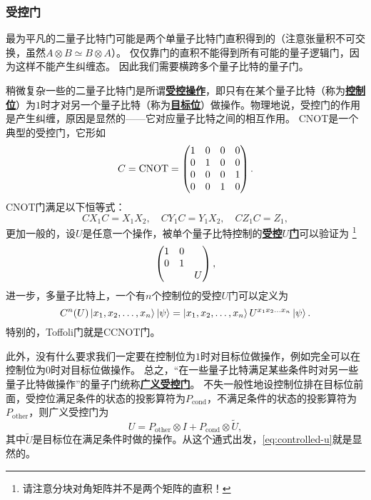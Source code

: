 \documentclass[hyperref, UTF8, a4paper]{ctexart}
\newcommand*{\concept}[1]{\underline{\textbf{#1}}}
\begin{document}
\subsubsection{受控门}

最为平凡的二量子比特门可能是两个单量子比特门直积得到的（注意张量积不可交换，虽然$A \otimes B \simeq B \otimes A$）。
仅仅靠门的直积不能得到所有可能的量子逻辑门，因为这样不能产生纠缠态。
因此我们需要横跨多个量子比特的量子门。

稍微复杂一些的二量子比特门是所谓\concept{受控操作}，即只有在某个量子比特（称为\concept{控制位}）为$1$时才对另一个量子比特（称为\concept{目标位}）做操作。物理地说，受控门的作用是产生纠缠，原因是显然的——它对应量子比特之间的相互作用。
CNOT是一个典型的受控门，它形如
\begin{equation}
    C = \mathrm{CNOT} = \pmqty{1 & 0 & 0 & 0 \\ 0 & 1 & 0 & 0 \\ 0 & 0 & 0 & 1 \\ 0 & 0 & 1 & 0}.
\end{equation}
CNOT门满足以下恒等式：
\begin{equation}
    C X_1 C = X_1 X_2, \quad C Y_1 C = Y_1 X_2, \quad C Z_1 C = Z_1,
\end{equation}
更加一般的，设$U$是任意一个操作，被单个量子比特控制的\concept{受控$U$门}可以验证为%
\footnote{请注意分块对角矩阵并不是两个矩阵的直积！}%
\begin{equation}
    \pmqty{\dmat{1 & 0 \\ 0 & 1, U}},
    \label{eq:controlled-u}
\end{equation}
进一步，多量子比特上，一个有$n$个控制位的受控$U$门可以定义为
\begin{equation}
    C^n(U) \ket{x_1, x_2, \ldots, x_n} \ket{\psi} = \ket{x_1, x_2, \ldots, x_n} U^{x_1 x_2 \ldots x_n} \ket{\psi}.
\end{equation}
特别的，Toffoli门就是CCNOT门。

此外，没有什么要求我们一定要在控制位为$1$时对目标位做操作，例如完全可以在控制位为$0$时对目标位做操作。
总之，“在一些量子比特满足某些条件时对另一些量子比特做操作”的量子门统称\concept{广义受控门}。
不失一般性地设控制位排在目标位前面，受控位满足条件的状态的投影算符为$P_\text{cond}$，不满足条件的状态的投影算符为$P_\text{other}$，则广义受控门为
\begin{equation}
    U = P_\text{other} \otimes I + P_\text{cond} \otimes \tilde{U},
\end{equation}
其中$\tilde{U}$是目标位在满足条件时做的操作。从这个通式出发，\eqref{eq:controlled-u}就是显然的。
\end{document}
